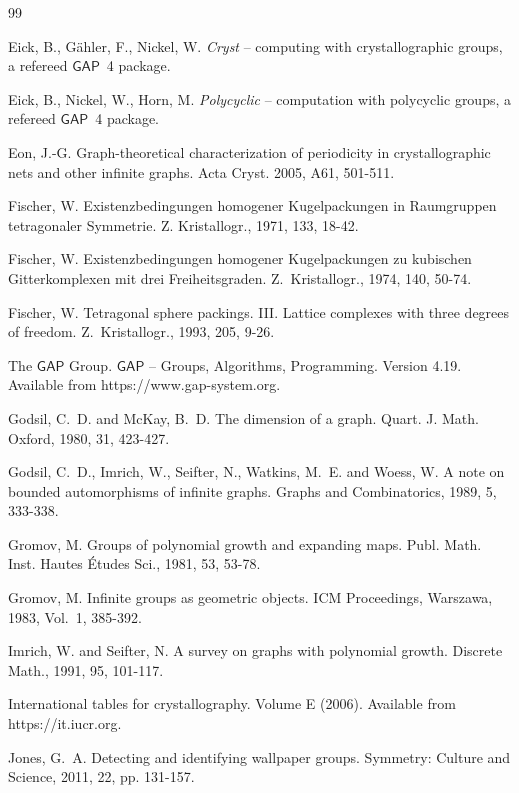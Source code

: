 \documentclass[11pt,a4paper]{article}
\newcommand{\GAP}{\mathsf{GAP}}
\begin{document}
\begin{thebibliography}{99}
\begin{small}
 Eick, B., G{\"a}hler, F., Nickel, W. \emph{Cryst} -- computing with crystallographic groups, a refereed $\GAP$~4 package.

 Eick, B., Nickel, W., Horn, M. \emph{Polycyclic} -- computation with polycyclic groups, a refereed $\GAP$~4 package.

 Eon, J.-G. Graph-theoretical characterization of periodicity in crystallographic nets and other infinite graphs. Acta Cryst. 2005, A61, 501-511.

 Fischer, W. Existenzbedingungen homogener Kugelpackungen in Raumgruppen tetragonaler Symmetrie. Z. Kristallogr., 1971, 133, 18-42.

 Fischer, W. Existenzbedingungen homogener Kugelpackungen zu kubischen Gitterkomplexen mit drei Freiheitsgraden. Z.~Kristallogr., 1974, 140, 50-74.

 Fischer, W. Tetragonal sphere packings. III. Lattice complexes with three degrees of freedom. Z.~Kristallogr., 1993, 205, 9-26.

 The $\GAP$ Group. $\GAP$ -- Groups, Algorithms, Programming. Version 4.19. Available from https://www.gap-system.org.

 Godsil, C.~D. and McKay, B.~D. The dimension of a graph. Quart. J. Math. Oxford, 1980, 31, 423-427.

 Godsil, C.~D., Imrich, W., Seifter, N., Watkins, M.~E. and Woess, W. A note on bounded automorphisms of infinite graphs.  Graphs and Combinatorics, 1989, 5, 333-338.

 Gromov, M. Groups of polynomial growth and expanding maps. Publ. Math. Inst. Hautes \'{E}tudes Sci., 1981, 53, 53-78.

 Gromov, M. Infinite groups as geometric objects. ICM Proceedings, Warszawa, 1983, Vol.~1, 385-392.


 Imrich, W. and Seifter, N. A survey on graphs with polynomial growth. Discrete Math., 1991, 95, 101-117.

 International tables for crystallography. Volume E (2006). Available from https://it.iucr.org.

 Jones, G.~A. Detecting and identifying wallpaper groups. Symmetry: Culture and Science, 2011, 22, pp. 131-157.


\end{small}
\end{thebibliography}
\end{document}
